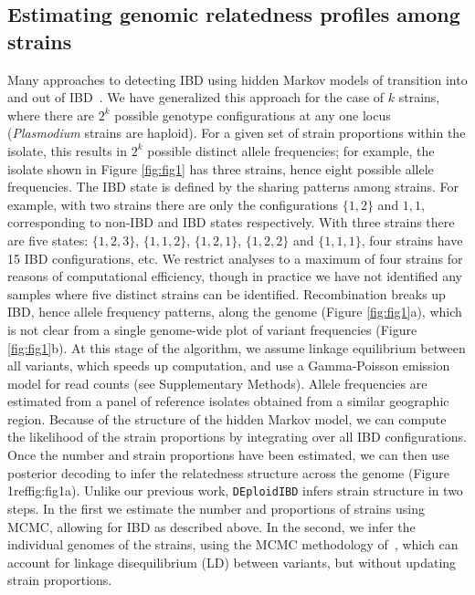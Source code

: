 \documentclass[9pt,lineno]{elife}
\begin{document}
\subsection{Estimating genomic relatedness profiles among strains}

Many approaches to detecting IBD using hidden Markov models of transition into and out of IBD~\citep{Chang2015, Gusev2009, Gusev2011}.  We have generalized this approach for the case of $k$ strains, where there are $2^k$ possible genotype configurations at any one locus ({\it Plasmodium} strains are haploid).  For a given set of strain proportions within the isolate, this results in $2^k$ possible distinct allele frequencies; for example, the isolate shown in Figure \ref{fig:fig1} has three strains, hence eight possible allele frequencies.  The IBD state is defined by the sharing patterns among strains.  For example, with two strains there are only the configurations $\{1,2\}$ and ${1,1}$, corresponding to non-IBD and IBD states respectively.  With three strains there are five states: $\{1,2,3\}$, $\{1,1,2\}$, $\{1,2,1\}$, $\{1,2,2\}$ and $\{1,1,1\}$, four strains have 15 IBD configurations, etc.  We restrict analyses to a maximum of four strains for reasons of computational efficiency, though in practice we have not identified any samples where five distinct strains can be identified.  Recombination breaks up IBD, hence allele frequency patterns, along the genome (Figure \ref{fig:fig1}a), which is not clear from a single genome-wide plot of variant frequencies (Figure \ref{fig:fig1}b).  At this stage of the algorithm, we assume linkage equilibrium between all variants, which speeds up computation, and use a Gamma-Poisson emission model for read counts (see Supplementary Methods).  Allele frequencies are estimated from a panel of reference isolates obtained from a similar geographic region.  Because of the structure of the hidden Markov model, we can compute the likelihood of the strain proportions by integrating over all IBD configurations.  Once the number and strain proportions have been estimated, we can then use posterior decoding to infer the relatedness structure across the genome (Figure 1ref{fig:fig1}a).
Unlike our previous work, \texttt{DEploidIBD} infers strain structure in two steps.  In the first we estimate the number and proportions of strains using MCMC, allowing for IBD as described above.  In the second, we infer the individual genomes of the strains, using the MCMC methodology of~\citet{Zhu2017}, which can account for linkage disequilibrium (LD) between variants, but without updating strain proportions.
\end{document}
